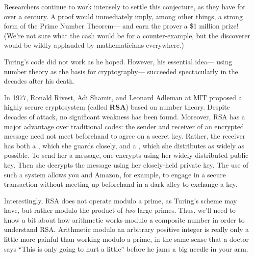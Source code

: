 {Researchers continue to work intensely to settle this conjecture, as they
have for over a century.  A proof would immediately imply, among other
things, a strong form of the Prime Number Theorem--- and earn the prover a
\$1 million prize!  (We're not sure what the cash would be for a
counter-example, but the discoverer would be wildly applauded by
mathematicians everywhere.)}

\begin{problems}
\classproblems
{}
\end{problems}

\label{arithmetic_modn}

Turing's code did not work as he hoped.  However, his essential
idea--- using number theory as the basis for cryptography--- succeeded
spectacularly in the decades after his death.

In 1977, Ronald Rivest, Adi Shamir, and Leonard Adleman at MIT proposed a
highly secure cryptosystem (called \textbf{RSA}) based on number theory.
Despite decades of attack, no significant weakness has been found.
Moreover, RSA has a major advantage over traditional codes: the sender and
receiver of an encrypted message need not meet beforehand to agree on a
secret key.  Rather, the receiver has both a , which she
guards closely, and a , which she distributes as widely
as possible.  To send her a message, one encrypts using her
widely-distributed public key.  Then she decrypts the message using her
closely-held private key.  The use of such a  system allows you and Amazon, for example, to engage in a
secure transaction without meeting up beforehand in a dark alley to
exchange a key.

Interestingly, RSA does not operate modulo a prime, as Turing's scheme
may have, but rather modulo the product of \emph{two} large primes.
Thus, we'll need to know a bit about how arithmetic works modulo a
composite number in order to understand RSA.  Arithmetic modulo an
arbitrary positive integer is really only a little more painful than
working modulo a prime, in the same sense that a doctor says ``This is
only going to hurt a little'' before he jams a big needle in your arm.

